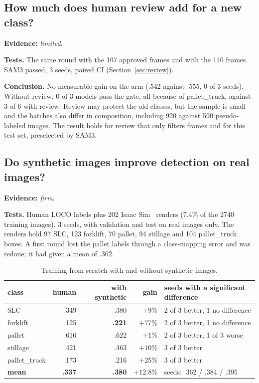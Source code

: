 \documentclass[11pt,a4paper]{article}
\newcommand{\evidence}[1]{\noindent\textbf{Evidence:} \emph{#1}.\par}
\newcommand{\tests}{\noindent\textbf{Tests.} }
\newcommand{\conclusion}{\noindent\textbf{Conclusion.} }
\begin{document}
\subsection{How much does human review add for a new class?}
\evidence{limited}

\tests The same round with the 107 approved frames and with the 140 frames SAM3
passed, 3 seeds, paired CI (Section~\ref{sec:review}).

\conclusion No measurable gain on the arm (.542 against .555, 0 of 3 seeds). Without
review, 0 of 3 models pass the gate, all because of pallet\_truck, against 3 of 6
with review. Review may protect the old classes, but the sample is small and the
batches also differ in composition, including 920 against 590 pseudo-labeled images.
The result holds for review that only filters frames and for this test set,
preselected by SAM3.

\subsection{Do synthetic images improve detection on real images?}
\evidence{firm}

\tests Human LOCO labels plus 202 Isaac Sim~\cite{isaac} renders (7.4\% of the 2740
training images), 3 seeds, with validation and test on real images only. The renders
hold 97 SLC, 123 forklift, 70 pallet, 94 stillage and 104 pallet\_truck boxes. A
first round lost the pallet labels through a class-mapping error and was redone; it
had given a mean of .362.

\begin{table}[H]
\centering\small
\caption{Training from scratch with and without synthetic images.}
\begin{tabular}{lrrrl}
\toprule
class & human & with synthetic & gain & seeds with a significant difference \\
\midrule
SLC & .349 & .380 & $+9\%$ & 2 of 3 better, 1 no difference \\
forklift & .125 & \textbf{.221} & $+77\%$ & 2 of 3 better, 1 no difference \\
pallet & .616 & .622 & $+1\%$ & 2 of 3 better, 1 of 3 worse \\
stillage & .421 & .463 & $+10\%$ & 3 of 3 better \\
pallet\_truck & .173 & .216 & $+25\%$ & 3 of 3 better \\
\textbf{mean} & \textbf{.337} & \textbf{.380} & $+12.8\%$ & seeds: .362 / .384 / .395 \\
\bottomrule
\end{tabular}
\end{table}
\end{document}
